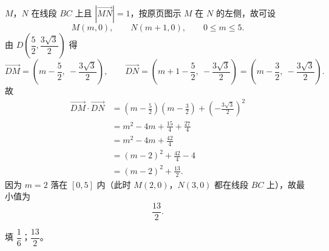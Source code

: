 \begin{answer}
$M$，$N$ 在线段 $BC$ 上且 $\left|\overrightarrow{MN}\right|=1$，按原页图示 $M$ 在 $N$ 的左侧，故可设
\nopagebreak[4]
\[M(m,0),\qquad N(m+1,0),\qquad 0\leqslant m\leqslant5 .\]
由 $D\left(\dfrac52,\dfrac{3\sqrt3}2\right)$ 得
\nopagebreak[4]
\[\overrightarrow{DM}=\left(m-\frac52,\ -\frac{3\sqrt3}2\right),\qquad \overrightarrow{DN}=\left(m+1-\frac52,\ -\frac{3\sqrt3}2\right)=\left(m-\frac32,\ -\frac{3\sqrt3}2\right).\]
故
\nopagebreak[4]
\[\begin{aligned}
\overrightarrow{DM}\cdot\overrightarrow{DN}
&=\left(m-\frac52\right)\left(m-\frac32\right)+\left(-\frac{3\sqrt3}2\right)^2\\
&=m^2-4m+\frac{15}4+\frac{27}4\\
&=m^2-4m+\frac{42}4\\
&=(m-2)^2+\frac{42}4-4\\
&=(m-2)^2+\frac{13}2 .
\end{aligned}\]
因为 $m=2$ 落在 $[0,5]$ 内（此时 $M(2,0)$，$N(3,0)$ 都在线段 $BC$ 上），故最小值为
\nopagebreak[4]
\[\frac{13}2 .\]

填 $\dfrac16$；$\dfrac{13}2$。


\end{answer}
